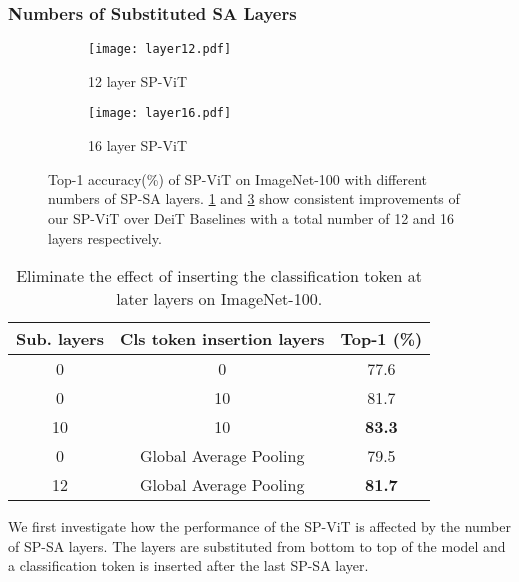 \documentclass[authorversion, sigconf, acmthm=false, nonacm=true]{acmart}
\begin{document}
\subsubsection{Numbers of Substituted SA Layers}


\begin{figure}[h]
  \centering
  \begin{subfigure}[12 layer SP-ViT]{0.23\textwidth}
      \texttt{[image: layer12.pdf]}
      \caption{12 layer SP-ViT}
      \label{12_layer}
  \end{subfigure}
  \begin{subfigure}[16 layer SP-ViT]{0.23\textwidth}
      \texttt{[image: layer16.pdf]}
      \caption{16 layer SP-ViT}
      \label{16_layer}
  \end{subfigure}

  \caption{Top-1 accuracy(\%) of SP-ViT on ImageNet-100 with different numbers of SP-SA layers. \cref{12_layer} and \cref{16_layer} show consistent improvements of our SP-ViT over DeiT Baselines with a total number of 12 and 16 layers respectively.}
\end{figure}
  









\begin{table}[ht]
  \caption{Eliminate the effect of inserting the classification token at later layers on ImageNet-100.}
  \centering
\begin{tabular}{ccc}
     \toprule
     Sub. layers  & Cls token insertion layers & Top-1 (\%)  \\
     \midrule
     0 & 0  &   77.6 \\

     0 & 10  &   81.7 \\

     10 & 10&    \textbf{83.3} \\
     \midrule

     0 & Global Average Pooling&    79.5 \\

     12 & Global Average Pooling&    \textbf{81.7} \\


     \bottomrule
  \end{tabular}
\label{table.compare}
  \end{table}


We first investigate how the performance of the SP-ViT is affected by the number of SP-SA layers. The layers are substituted from bottom to top of the model and a classification token is inserted after the last SP-SA layer.
\end{document}
